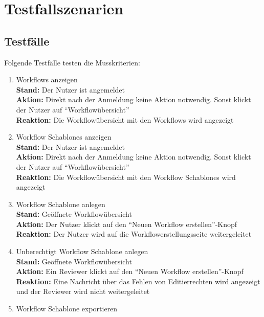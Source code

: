 \chapter{Testfallszenarien}

\section{Testfälle}
Folgende Testfälle testen die Musskriterien:
\renewcommand{\labelenumi}{/T\arabic{enumi}0/}
\begin{enumerate}
    \item \glspl{Workflow} anzeigen
        \\ \textbf{Stand:} Der \Gls{Nutzer} ist angemeldet
        \\ \textbf{Aktion:} Direkt nach der Anmeldung keine Aktion notwendig. Sonst klickt der \Gls{Nutzer} auf \enquote{Workflowübersicht}
        \\ \textbf{Reaktion:} Die Workflowübersicht mit den \glspl{Workflow} wird angezeigt
    \item \glspl{Workflow Schablone} anzeigen
        \\ \textbf{Stand:} Der \Gls{Nutzer} ist angemeldet
        \\ \textbf{Aktion:} Direkt nach der Anmeldung keine Aktion notwendig. Sonst klickt der \Gls{Nutzer} auf \enquote{Workflowübersicht}
        \\ \textbf{Reaktion:} Die Workflowübersicht mit den \glspl{Workflow Schablone} wird angezeigt
    \item \gls{Workflow Schablone} anlegen
        \\ \textbf{Stand:} Geöffnete Workflowübersicht
        \\ \textbf{Aktion:} Der \Gls{Nutzer} klickt auf den \enquote{Neuen Workflow erstellen}-Knopf
        \\ \textbf{Reaktion:} Der \Gls{Nutzer} wird auf die Workflowerstellungsseite weitergeleitet
    \item Unberechtigt \gls{Workflow Schablone} anlegen
        \\ \textbf{Stand:} Geöffnete Workflowübersicht
        \\ \textbf{Aktion:} Ein \Gls{Reviewer} klickt auf den \enquote{Neuen Workflow erstellen}-Knopf
        \\ \textbf{Reaktion:} Eine Nachricht über das Fehlen von Editierrechten wird angezeigt und der \Gls{Reviewer} wird nicht weitergeleitet
    \item \gls{Workflow Schablone} exportieren

\end{enumerate}
